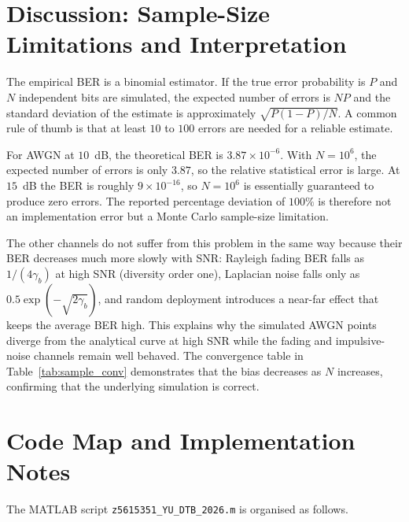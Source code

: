 \documentclass[12pt,a4paper]{article}
\begin{document}
\section{Discussion: Sample-Size Limitations and Interpretation}\label{sec:discussion}
The empirical BER is a binomial estimator. If the true error probability is $P$ and $N$ independent bits are simulated, the expected number of errors is $NP$ and the standard deviation of the estimate is approximately $\sqrt{P(1-P)/N}$. A common rule of thumb is that at least $10$ to $100$ errors are needed for a reliable estimate.

For AWGN at $10$~dB, the theoretical BER is $3.87\times 10^{-6}$. With $N=10^6$, the expected number of errors is only $3.87$, so the relative statistical error is large. At $15$~dB the BER is roughly $9\times 10^{-16}$, so $N=10^6$ is essentially guaranteed to produce zero errors. The reported percentage deviation of $100\%$ is therefore not an implementation error but a Monte Carlo sample-size limitation.

The other channels do not suffer from this problem in the same way because their BER decreases much more slowly with SNR: Rayleigh fading BER falls as $1/(4\gamma_b)$ at high SNR (diversity order one), Laplacian noise falls only as $0.5\exp(-\sqrt{2\gamma_b})$, and random deployment introduces a near-far effect that keeps the average BER high. This explains why the simulated AWGN points diverge from the analytical curve at high SNR while the fading and impulsive-noise channels remain well behaved. The convergence table in Table~\ref{tab:sample_conv} demonstrates that the bias decreases as $N$ increases, confirming that the underlying simulation is correct.

\section{Code Map and Implementation Notes}\label{sec:code}
The MATLAB script \texttt{z5615351\_YU\_DTB\_2026.m} is organised as follows.
\end{document}
